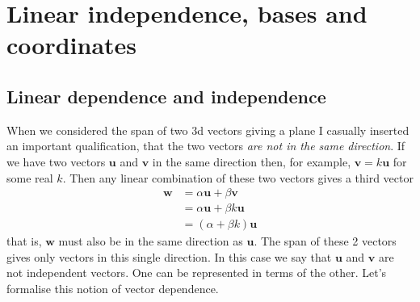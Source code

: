 \section{Linear independence, bases and coordinates}
\subsection*{Linear dependence and independence}

\noindent When we considered the span of two 3d vectors giving a plane I casually inserted an important qualification, that the two vectors \textit{are not in the same direction}. If we have two vectors $\mathbf{u}$ and $\mathbf{v}$ in the same direction then, for example, $\mathbf{v}=k\mathbf{u}$ for some real $k$. Then any linear combination of these two vectors gives a third vector
\begin{align*}
\mathbf{w} &= \alpha \mathbf{u} + \beta \mathbf{v} \\
&= \alpha \mathbf{u} + \beta k\mathbf{u} \\
&= \left(\alpha + \beta k\right) \mathbf{u}
\end{align*}
that is, $\mathbf{w}$ must also be in the same direction as $\mathbf{u}$. The span of these 2 vectors gives only vectors in this single direction. In this case we say that $\mathbf{u}$ and $\mathbf{v}$ are not independent vectors. One can be represented in terms of the other. Let's formalise this notion of vector dependence.


